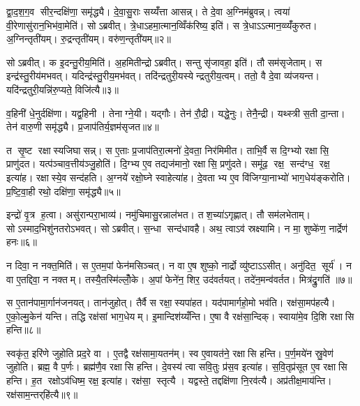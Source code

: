 द्वा॒द॒श॒ग॒व सीर॒न्दक्षि॑णा॒ समृ॑द्ध्यै। दे॒वा॒सु॒राः सय्यँ॑त्ता आसन्न्। ते दे॒वा अ॒ग्निम॑ब्रुवन्न्। त्वया॑ वी॒रेणासु॑रान॒भिभ॑वा॒मेति॑। सोऽब्रवीत्। त्रे॒धाऽहमा॒त्मान॒व्विँक॑रिष्य॒ इति॑। स त्रे॒धाऽऽत्मान॒व्व्यँ॑कुरुत। अ॒ग्निन्तृती॑यम्। रु॒द्रन्तृती॑यम्। वरु॑ण॒न्तृती॑यम्॥२॥

सोऽब्रवीत्। क इ॒दन्तु॒रीय॒मिति॑। अ॒हमितीन्द्रोऽब्रवीत्। सन्तु सृ॑जावहा॒ इति॑। तौ सम॑सृजेताम्। स इन्द्र॑स्तु॒रीय॑मभवत्। यदिन्द्र॑स्तु॒रीय॒मभ॑वत्। तदि॑न्द्रतुरी॒यस्येन्द्रतुरीय॒त्वम्। ततो॒ वै दे॒वा व्य॑जयन्त। यदि॑न्द्रतुरी॒यन्नि॑रु॒प्यते॒ विजि॑त्यै॥३॥

व॒हिनी॑ धे॒नुर्दक्षि॑णा। यद्व॒हिनी। तेनाग्ने॒यी। यद्गौः। तेन॑ रौ॒द्री। यद्धे॒नुः। तेनै॒न्द्री। यथ्स्त्री स॒ती दा॒न्ता। तेन॑ वारु॒णी समृ॑द्ध्यै। प्र॒जाप॑तिर्य॒ज्ञम॑सृजत॥४॥

त सृ॒ष्ट रक्षास्यजिघासन्न्। स ए॒ताः प्र॒जाप॑तिरा॒त्मनो॑ दे॒वता॒ निर॑मिमीत। ताभि॒र्वै स दि॒ग्भ्यो रक्षासि॒ प्राणु॑दत। यत्प॑ञ्चाव॒त्तीय॑ञ्जु॒होति॑। दि॒ग्भ्य ए॒व तद्यज॑मानो॒ रक्षासि॒ प्रणु॑दते। समू॑ढ॒ रक्ष॒ सन्द॑ग्ध॒ रक्ष॒ इत्या॑ह। रक्षास्ये॒व सन्द॑हति। अ॒ग्नये॑ रक्षो॒घ्ने स्वाहेत्या॑ह। दे॒वताभ्य ए॒व वि॑जिग्या॒नाभ्यो॑ भाग॒धेय॑ङ्करोति। प्र॒ष्टि॒वा॒ही रथो॒ दक्षि॑णा॒ समृ॑द्ध्यै॥५॥

इन्द्रो॑ वृ॒त्र ह॒त्वा। असु॑रान्परा॒भाव्य॑। नमु॑चिमासु॒रन्नाल॑भत। तश॒च्या॑ऽगृह्णात्। तौ सम॑लभेताम्। सोऽस्माद॒भिशु॑नतरोऽभवत्। सोऽब्रवीत्। स॒न्धा सन्द॑धावहै। अथ॒ त्वाऽव॑ स्रक्ष्यामि। न मा॒ शुष्के॑ण॒ नार्द्रेण॑ हनः॥६॥

न दिवा॒ न नक्त॒मिति॑। स ए॒तम॒पां फेन॑मसिञ्चत्। न वा ए॒ष शुष्को॒ नार्द्रो व्यु॑ष्टाऽऽसीत्। अनु॑दित॒ सूर्य॑। न वा ए॒तद्दिवा॒ न नक्तम्। तस्यै॒तस्मि॑ल्लोँ॒के। अ॒पां फेने॑न॒ शिर॒ उद॑वर्तयत्। तदे॑न॒मन्व॑वर्तत। मित्र॑द्रु॒गति॑ ॥७॥

स ए॒तान॑पामा॒र्गान॑जनयत्। तान॑जुहोत्। तैर्वै स रक्षा॒स्यपा॑हत। यद॑पामार्गहो॒मो भव॑ति। रक्ष॑सा॒मप॑हत्यै। ए॒को॒ल्मु॒केन॑ यन्ति। तद्धि रक्ष॑सां भाग॒धेयम्। इ॒मान्दिश॑य्यँन्ति। ए॒षा वै रक्ष॑सा॒न्दिक्। स्वाया॑मे॒व दि॒शि रक्षासि हन्ति॥८॥

स्वकृ॑त॒ इरि॑णे जुहोति प्रद॒रे वा। ए॒तद्वै रक्ष॑सामा॒यतन॑म्। स्व ए॒वायत॑ने॒ रक्षासि हन्ति। प॒र्ण॒मये॑न स्रु॒वेण॑ जुहोति। ब्रह्म॒ वै प॒र्णः। ब्रह्म॑णै॒व रक्षासि हन्ति। दे॒वस्य॑ त्वा सवि॒तुः प्र॑स॒व इत्या॑ह। स॒वि॒तृप्र॑सूत ए॒व रक्षासि हन्ति। ह॒त रक्षोऽव॑धिष्म॒ रक्ष॒ इत्या॑ह। रक्ष॑सा॒ स्तृत्यै। यद्वस्ते॒ तद्दक्षि॑णा नि॒रव॑त्यै। अप्र॑तीक्ष॒माय॑न्ति। रक्ष॑साम॒न्तर्‌हि॑त्यै॥९॥\anuvakamend[य॒च्छ॒ति॒ वरु॑ण॒न्तृती॑य॒व्विँजि॑त्या असृजत॒ समृ॑द्ध्यै हनो॒ मित्र॑द्रु॒गिति॑ हन्ति॒ स्तृत्यै॒ त्रीणि॑ च]

